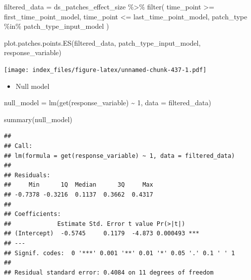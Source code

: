 \documentclass[
]{article}
\newenvironment{Shaded}{\begin{snugshade}}{\end{snugshade}}
\newcommand{\AttributeTok}[1]{\textcolor[rgb]{0.77,0.63,0.00}{#1}}
\newcommand{\DecValTok}[1]{\textcolor[rgb]{0.00,0.00,0.81}{#1}}
\newcommand{\FunctionTok}[1]{\textcolor[rgb]{0.00,0.00,0.00}{#1}}
\newcommand{\NormalTok}[1]{#1}
\newcommand{\OtherTok}[1]{\textcolor[rgb]{0.56,0.35,0.01}{#1}}
\newcommand{\SpecialCharTok}[1]{\textcolor[rgb]{0.00,0.00,0.00}{#1}}
\providecommand{\tightlist}{%
  \setlength{\itemsep}{0pt}\setlength{\parskip}{0pt}}
\begin{document}
\begin{Shaded}
\begin{Highlighting}[]
\NormalTok{filtered\_data }\OtherTok{=}\NormalTok{ ds\_patches\_effect\_size }\SpecialCharTok{\%\textgreater{}\%}
  \FunctionTok{filter}\NormalTok{(}
\NormalTok{    time\_point }\SpecialCharTok{\textgreater{}=}\NormalTok{ first\_time\_point\_model,}
\NormalTok{    time\_point }\SpecialCharTok{\textless{}=}\NormalTok{ last\_time\_point\_model,}
\NormalTok{    patch\_type }\SpecialCharTok{\%in\%}\NormalTok{ patch\_type\_input\_model}
\NormalTok{  )}
\end{Highlighting}
\end{Shaded}

\begin{Shaded}
\begin{Highlighting}[]
\FunctionTok{plot.patches.points.ES}\NormalTok{(filtered\_data,}
\NormalTok{                       patch\_type\_input\_model,}
\NormalTok{                       response\_variable)}
\end{Highlighting}
\end{Shaded}

\texttt{[image: index\_files/figure-latex/unnamed-chunk-437-1.pdf]}

\begin{itemize}
\tightlist
\item
  Null model
\end{itemize}

\begin{Shaded}
\begin{Highlighting}[]
\NormalTok{null\_model }\OtherTok{=} \FunctionTok{lm}\NormalTok{(}\FunctionTok{get}\NormalTok{(response\_variable) }\SpecialCharTok{\textasciitilde{}}
                  \DecValTok{1}\NormalTok{,}
                \AttributeTok{data =}\NormalTok{ filtered\_data)}

\FunctionTok{summary}\NormalTok{(null\_model)}
\end{Highlighting}
\end{Shaded}

\begin{verbatim}
## 
## Call:
## lm(formula = get(response_variable) ~ 1, data = filtered_data)
## 
## Residuals:
##     Min      1Q  Median      3Q     Max 
## -0.7378 -0.3216  0.1137  0.3662  0.4317 
## 
## Coefficients:
##             Estimate Std. Error t value Pr(>|t|)    
## (Intercept)  -0.5745     0.1179  -4.873 0.000493 ***
## ---
## Signif. codes:  0 '***' 0.001 '**' 0.01 '*' 0.05 '.' 0.1 ' ' 1
## 
## Residual standard error: 0.4084 on 11 degrees of freedom
\end{verbatim}
\end{document}
